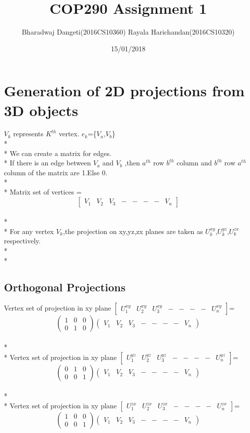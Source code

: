 \documentclass[a4paper]{article}
\title{COP290 Assignment 1}
\date{15/01/2018}
\author{Bharadwaj Dangeti(2016CS10360) Rayala Harichandan(2016CS10320)}
\begin{document}
 \maketitle
 \section{Generation of 2D projections from 3D objects}
$V_k$ represents $K^{th}$ vertex.
$e_k$=\{$V_a$,$V_b$\}
\\*
\\*
We can create a matrix for edges.
\\*
If there is an edge between $V_a$ and $V_b$ ,then $a^{th}$ row $b^{th}$ column and $b^{th}$ row $a^{th}$ column of the matrix are 1.Else 0.
\\*\\*
Matrix set of vertices =\[\begin{bmatrix}
V_1&V_2&V_3&-&-&-&-&V_n
\end{bmatrix}
\]\\*
\\*
For any vertex $V_k$,the projection on xy,yz,zx planes are taken as $U_k^{xy}$,$U_k^{yz}$,$U_k^{zx}$ respectively.
\\*\\*
\subsection{Orthogonal Projections}
Vertex set of projection in xy plane \(\begin{bmatrix}
U_1^{xy}&U_2^{xy}&U_3^{xy}&-&-&-&-&U_n^{xy}
\end{bmatrix}
\)=
\[ \left( \begin{array}{cccccccc}
1&0&0\\
0&1&0
\end{array} \right)
%
\left( \begin{array}{cccccccc}
V_1&V_2&V_3&-&-&-&-&V_n
\end{array} \right)
\] 
\\*\\*
Vertex set of projection in xy plane \(\begin{bmatrix}
U_1^{yz}&U_2^{yz}&U_3^{yz}&-&-&-&-&U_n^{yz}
\end{bmatrix}
\)=
\[ \left( \begin{array}{cccccccc}
0&1&0\\
0&0&1
\end{array} \right)
%
\left( \begin{array}{cccccccc}
V_1&V_2&V_3&-&-&-&-&V_n
\end{array} \right)
\] 
\\*\\*
Vertex set of projection in xy plane \(\begin{bmatrix}
U_1^{zx}&U_2^{zx}&U_3^{zx}&-&-&-&-&U_n^{zx}
\end{bmatrix}
\)=
\[ \left( \begin{array}{cccccccc}
1&0&0\\
0&0&1
\end{array} \right)
%
\left( \begin{array}{cccccccc}
V_1&V_2&V_3&-&-&-&-&V_n
\end{array} \right)
\] 
\end{document}
